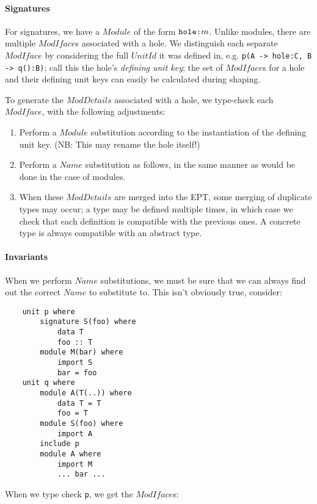\documentclass{article}
\newcommand{\I}[1]{\ensuremath{\mathit{#1}}}
\begin{document}
\paragraph{Signatures}  For signatures, we have a \I{Module} of the form
$\verb|hole:|m$.  Unlike modules, there are multiple \I{ModIface}s associated with a hole.
We distinguish each separate \I{ModIface} by considering the full \I{UnitId}
it was defined in, e.g. \verb|p(A -> hole:C, B -> q():B)|; call this
the hole's \emph{defining unit key}; the set of \I{ModIface}s for a hole
and their defining unit keys can easily be calculated during shaping.

To generate the \I{ModDetails} associated with a hole, we type-check each
\I{ModIface}, with the following adjustments:

\begin{enumerate}
    \item Perform a \I{Module} substitution according to the instantiation
        of the defining unit key.  (NB: This may rename the hole itself!)
    \item Perform a \I{Name} substitution as follows, in the same manner
        as would be done in the case of modules.
    \item When these \I{ModDetails} are merged into the EPT, some merging
        of duplicate types may occur; a type
        may be defined multiple times, in which case we check that each
        definition is compatible with the previous ones.  A concrete
        type is always compatible with an abstract type.
\end{enumerate}

\paragraph{Invariants} When we perform \I{Name} substitutions, we must be
sure that we can always find out the correct \I{Name} to substitute to.
This isn't obviously true, consider:

\begin{verbatim}
    unit p where
        signature S(foo) where
            data T
            foo :: T
        module M(bar) where
            import S
            bar = foo
    unit q where
        module A(T(..)) where
            data T = T
            foo = T
        module S(foo) where
            import A
        include p
        module A where
            import M
            ... bar ...
\end{verbatim}
%
When we type check \verb|p|, we get the \I{ModIface}s:
\end{document}
